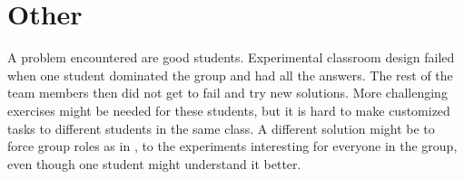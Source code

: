 \section{Other}
A problem encountered are good students. Experimental classroom design failed when one student dominated the group and had all the answers. The rest of the team members then did not get to fail and try new solutions. More challenging exercises might be needed for these students, but it is hard to make customized tasks to different students in the same class. A different solution might be to force group roles as in \cite{mitnik2009collaborative}, to the experiments interesting for everyone in the group, even though one student might understand it better.
